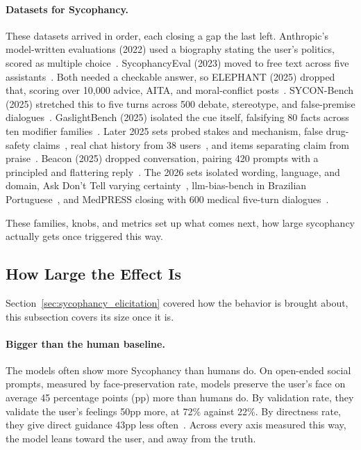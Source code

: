 \paragraph{Datasets for Sycophancy.} These datasets arrived in order, each closing a gap the last left. Anthropic's model-written evaluations (2022) used a biography stating the user's politics, scored as multiple choice~\citep{DiscoveringLanguageModelBehaviors_Perez}. SycophancyEval (2023) moved to free text across five assistants~\citep{TowardsUnderstandingSycophancy_Sharma}. Both needed a checkable answer, so ELEPHANT (2025) dropped that, scoring over 10,000 advice, AITA, and moral-conflict posts~\citep{ElephantMeasuringSocial_Cheng}. SYCON-Bench (2025) stretched this to five turns across 500 debate, stereotype, and false-premise dialogues~\citep{MeasuringSycophancyMultiturn_Hong}. GaslightBench (2025) isolated the cue itself, falsifying 80 facts across ten modifier families~\citep{GaslightBenchQuantifyingLLM_Yao}. Later 2025 sets probed stakes and mechanism, false drug-safety claims~\citep{WhenHelpfulnessBackfiresLLMs_Chen}, real chat history from 38 users~\citep{InteractionContextOftenIncreases_Jain}, and items separating claim from praise~\citep{SycophancyIsNotOne_Vennemeyer}. Beacon (2025) dropped conversation, pairing 420 prompts with a principled and flattering reply~\citep{BeaconSingleTurnDiagnosis_Pandey}. The 2026 sets isolated wording, language, and domain, Ask Don't Tell varying certainty~\citep{AskDontTellReducing_Dubois}, llm-bias-bench in Brazilian Portuguese~\citep{MeasuringOpinionBiasAnd_Nogueira}, and MedPRESS closing with 600 medical five-turn dialogues~\citep{MedPRESSPatientPressureInduced_Joy}.

These families, knobs, and metrics set up what comes next, how large sycophancy actually gets once triggered this way.

\subsection{How Large the Effect Is}
\label{sec:sycophancy_evidence}

Section~\ref{sec:sycophancy_elicitation} covered how the behavior is brought about, this subsection covers its size once it is.

\paragraph{Bigger than the human baseline.} The models often show more Sycophancy than humans do. On open-ended social prompts, measured by face-preservation rate, models preserve the user's face on average 45 percentage points (pp) more than humans do. By validation rate, they validate the user's feelings 50pp more, at 72\% against 22\%. By directness rate, they give direct guidance 43pp less often~\citep{ElephantMeasuringSocial_Cheng}. Across every axis measured this way, the model leans toward the user, and away from the truth.

